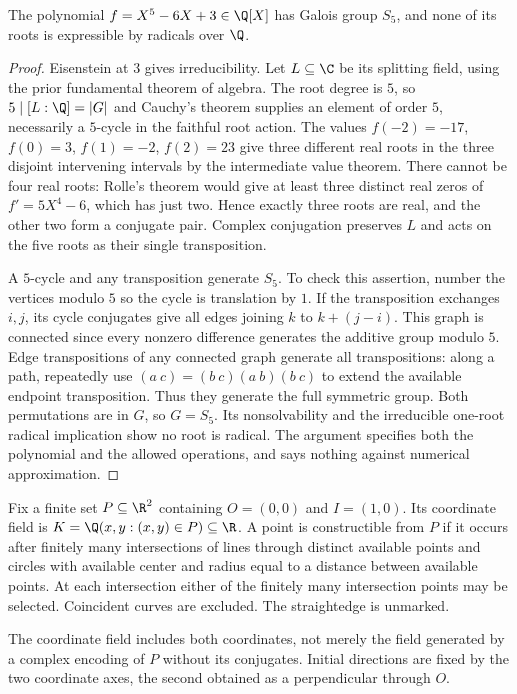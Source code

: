 \begin{theorem}
The polynomial $f=X^5-6X+3\in\Q[X]$ has Galois group $S_5$, and none of its roots is expressible by radicals over $\Q$.
\end{theorem}
\begin{proof}
Eisenstein at $3$ gives irreducibility. Let $L\subseteq\C$ be its splitting field, using the prior fundamental theorem of algebra. The root degree is $5$, so $5\mid[L:\Q]=|G|$ and Cauchy's theorem supplies an element of order $5$, necessarily a $5$-cycle in the faithful root action. The values $f(-2)=-17$, $f(0)=3$, $f(1)=-2$, $f(2)=23$ give three different real roots in the three disjoint intervening intervals by the intermediate value theorem. There cannot be four real roots: Rolle's theorem would give at least three distinct real zeros of $f'=5X^4-6$, which has just two. Hence exactly three roots are real, and the other two form a conjugate pair. Complex conjugation preserves $L$ and acts on the five roots as their single transposition.

A $5$-cycle and any transposition generate $S_5$. To check this assertion, number the vertices modulo $5$ so the cycle is translation by $1$. If the transposition exchanges $i,j$, its cycle conjugates give all edges joining $k$ to $k+(j-i)$. This graph is connected since every nonzero difference generates the additive group modulo $5$. Edge transpositions of any connected graph generate all transpositions: along a path, repeatedly use $(a\ c)=(b\ c)(a\ b)(b\ c)$ to extend the available endpoint transposition. Thus they generate the full symmetric group. Both permutations are in $G$, so $G=S_5$. Its nonsolvability and the irreducible one-root radical implication show no root is radical. The argument specifies both the polynomial and the allowed operations, and says nothing against numerical approximation.
\end{proof}

\begin{definition}
Fix a finite set $P\subseteq\R^2$ containing $O=(0,0)$ and $I=(1,0)$. Its coordinate field is $K=\Q(x,y:(x,y)\in P)\subseteq\R$. A point is constructible from $P$ if it occurs after finitely many intersections of lines through distinct available points and circles with available center and radius equal to a distance between available points. At each intersection either of the finitely many intersection points may be selected. Coincident curves are excluded. The straightedge is unmarked.
\end{definition}
The coordinate field includes both coordinates, not merely the field generated by a complex encoding of $P$ without its conjugates. Initial directions are fixed by the two coordinate axes, the second obtained as a perpendicular through $O$.

